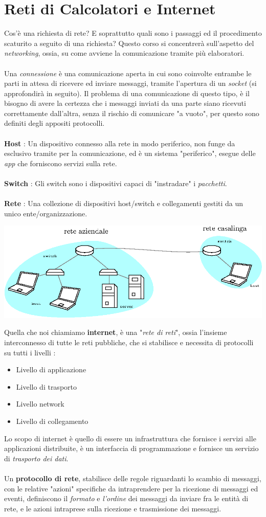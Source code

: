 \documentclass[12pt, letterpaper]{article}
\newcommand{\acc}{\\\hphantom{}\\}
\begin{document}
\section{Reti di Calcolatori e Internet}
Cos'è una richiesta di rete? E soprattutto quali sono i passaggi ed il procedimento scaturito a seguito di una richiesta? Questo corso
si concentrerà sull'aspetto del \textit{networking}, ossia, su come avviene la comunicazione tramite più elaboratori.\acc
Una \textit{connessione} è una comunicazione aperta in cui sono coinvolte entrambe le parti in attesa di ricevere ed inviare
messaggi, tramite l'apertura di un \textit{socket} (si approfondirà in seguito). Il problema di una comunicazione di questo tipo,
è il bisogno di avere la certezza che i messaggi inviati da una parte siano ricevuti correttamente dall'altra, senza il rischio di
comunicare "a vuoto", per questo sono definiti degli appositi protocolli.\acc
\textbf{Host} : Un dispositivo connesso alla rete in modo periferico, non funge da esclusivo tramite per la comunicazione,
ed è un sistema "periferico", esegue delle \textit{app} che forniscono servizi sulla rete.\acc
\textbf{Switch} : Gli switch sono i dispositivi capaci di "instradare" i \textit{pacchetti}.\acc
\textbf{Rete} : Una collezione di dispositivi host/switch e collegamenti gestiti da un unico ente/organizzazione.\begin{center}
    \includegraphics[width=1\textwidth ]{images/reteDef.eps}
\end{center}
Quella che noi chiamiamo \textbf{internet}, è una "\textit{rete di reti}", ossia l'insieme interconnesso di tutte le reti
pubbliche, che si stabilisce e necessita di protocolli su tutti i livelli : \begin{itemize}
    \item Livello di applicazione
    \item Livello di trasporto
    \item Livello network
    \item Livello di collegamento
\end{itemize}
Lo scopo di internet è quello di essere un infrastruttura che fornisce i servizi alle applicazioni distribuite, è
un interfaccia di programmazione e fornisce un servizio di \textit{trasporto dei dati}.\acc
Un \textbf{protocollo di rete}, stabilisce delle regole riguardanti lo scambio di messaggi, con le relative "azioni" specifiche
da intraprendere per la ricezione di messaggi ed eventi, definiscono il \textit{formato} e \textit{l'ordine} dei messaggi
da inviare fra le entità di rete, e le azioni intraprese sulla ricezione e trasmissione dei messaggi.
\end{document}
